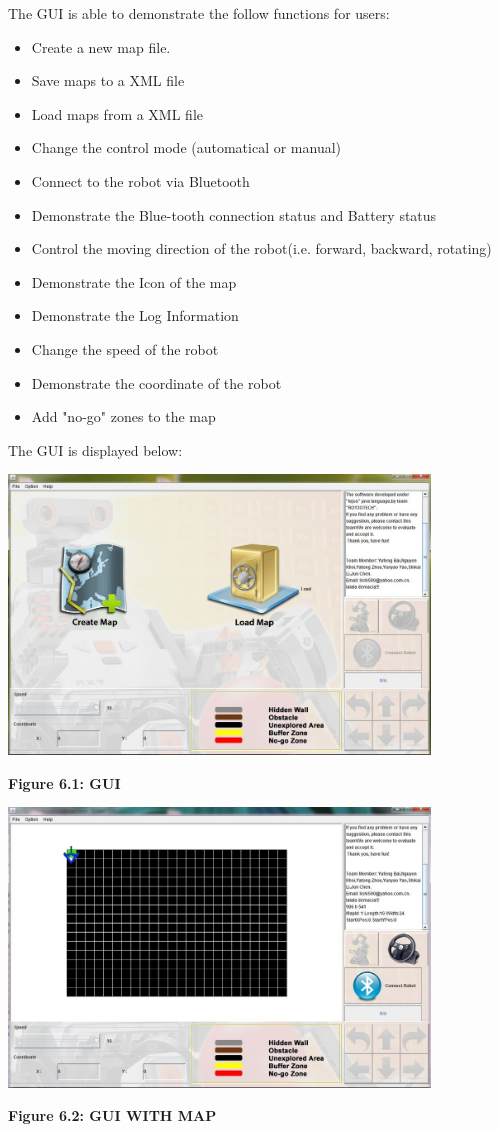 \documentclass[11pt, a4paper]{report}
\begin{document}
The GUI is able to demonstrate the follow functions for users:
\begin{itemize}
\item Create a new map file.
\item Save maps to a XML file
\item Load maps from a XML file
\item Change the control mode (automatical or manual)
\item Connect to the robot via Bluetooth
\item Demonstrate the Blue-tooth connection status and Battery status
\item Control the moving direction of the robot(i.e. forward, backward, rotating)
\item Demonstrate the Icon of the map
\item Demonstrate the Log Information
\item Change the speed of the robot
\item Demonstrate the coordinate of the robot
\item Add "no-go" zones to the map
\end{itemize}
The GUI is displayed below:
\pagebreak
\begin{center}
 \includegraphics[width=11.20cm]{GUI_Initial.jpg}
\end{center}
\begin{center}
\textbf {Figure 6.1: GUI} \\[0.3cm]
\end{center}
\begin{center}
 \includegraphics[width=11.20cm]{Map.jpg}
\end{center}
\begin{center}
\textbf {Figure 6.2: GUI WITH MAP} \\[0.3cm]
\end{center}
\end{document}
